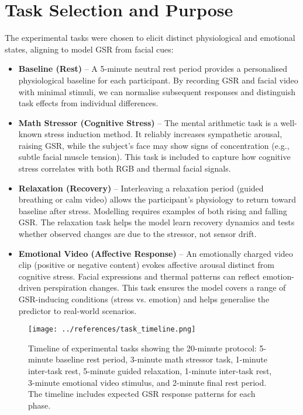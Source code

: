 \documentclass{article}
\begin{document}
\section{Task Selection and Purpose}
The experimental tasks were chosen to elicit distinct physiological and emotional states, aligning to model GSR from facial cues:
\begin{itemize}
    \item \textbf{Baseline (Rest)} -- A 5-minute neutral rest period provides a personalised physiological baseline for each participant. By recording GSR and facial video with minimal stimuli, we can normalise subsequent responses and distinguish task effects from individual differences.
    \item \textbf{Math Stressor (Cognitive Stress)} -- The mental arithmetic task is a well-known stress induction method. It reliably increases sympathetic arousal, raising GSR, while the subject’s face may show signs of concentration (e.g., subtle facial muscle tension). This task is included to capture how cognitive stress correlates with both RGB and thermal facial signals.
    \item \textbf{Relaxation (Recovery)} -- Interleaving a relaxation period (guided breathing or calm video) allows the participant’s physiology to return toward baseline after stress. Modelling requires examples of both rising and falling GSR. The relaxation task helps the model learn recovery dynamics and tests whether observed changes are due to the stressor, not sensor drift.
    \item \textbf{Emotional Video (Affective Response)} -- An emotionally charged video clip (positive or negative content) evokes affective arousal distinct from cognitive stress. Facial expressions and thermal patterns can reflect emotion-driven perspiration changes. This task ensures the model covers a range of GSR-inducing conditions (stress vs. emotion) and helps generalise the predictor to real-world scenarios.
\end{itemize}
\begin{figure}[h]
    \centering
    \texttt{[image: ../references/task\_timeline.png]}
    \caption{Timeline of experimental tasks showing the 20-minute protocol: 5-minute baseline rest period, 3-minute math stressor task, 1-minute inter-task rest, 5-minute guided relaxation, 1-minute inter-task rest, 3-minute emotional video stimulus, and 2-minute final rest period. The timeline includes expected GSR response patterns for each phase.}
\end{figure}
\end{document}
